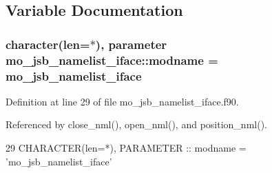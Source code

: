 \subsection{Variable Documentation}
\hypertarget{namespacemo__jsb__namelist__iface_ac285553fa6612b5913578b420275d81b}{}
\subsubsection[{modname}]{\setlength{\rightskip}{0pt plus 5cm}character(len=$\ast$), parameter mo\+\_\+jsb\+\_\+namelist\+\_\+iface\+::modname = \textquotesingle{}mo\+\_\+jsb\+\_\+namelist\+\_\+iface\textquotesingle{}}\label{namespacemo__jsb__namelist__iface_ac285553fa6612b5913578b420275d81b}


Definition at line 29 of file mo\+\_\+jsb\+\_\+namelist\+\_\+iface.\+f90.



Referenced by close\+\_\+nml(), open\+\_\+nml(), and position\+\_\+nml().


\begin{DoxyCode}
29   \textcolor{keywordtype}{CHARACTER(len=*)}, \textcolor{keywordtype}{PARAMETER} :: modname = \textcolor{stringliteral}{'mo\_jsb\_namelist\_iface'}
\end{DoxyCode}
